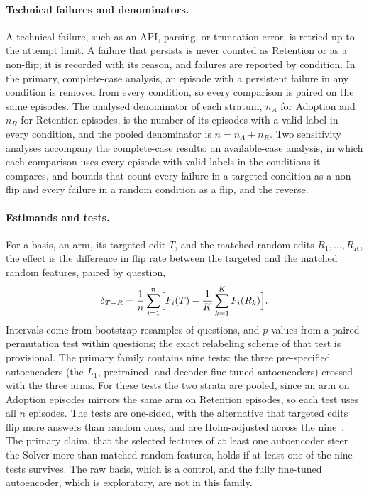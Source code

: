 \paragraph{Technical failures and denominators.} A technical failure, such as
an API, parsing, or truncation error, is retried up to the attempt limit. A
failure that persists is never counted as Retention or as a non-flip; it is
recorded with its reason, and failures are reported by condition. In the
primary, complete-case analysis, an episode with a persistent failure in any
condition is removed from every condition, so every comparison is paired on
the same episodes. The analysed denominator of each stratum, $n_A$ for
Adoption and $n_R$ for Retention episodes, is the number of its episodes with
a valid label in every condition, and the pooled denominator is
$n = n_A + n_R$. Two sensitivity analyses accompany the complete-case results:
an available-case analysis, in which each comparison uses every episode with
valid labels in the conditions it compares, and bounds that count every
failure in a targeted condition as a non-flip and every failure in a random
condition as a flip, and the reverse.

\paragraph{Estimands and tests.} For a basis, an arm, its targeted edit $T$,
and the matched random edits $R_1, \ldots, R_K$, the effect is the difference
in flip rate between the targeted and the matched random features, paired by
question,
\begin{equation}
  \delta_{T-R} = \frac{1}{n}\sum_{i=1}^{n}
  \Bigl[F_i(T) - \frac{1}{K}\sum_{k=1}^{K} F_i(R_k)\Bigr].
  \label{eq:targeted-vs-random}
\end{equation}
Intervals come from bootstrap resamples of questions, and $p$-values from a
paired permutation test within questions; the exact relabeling scheme of that
test is provisional. The primary family contains nine tests: the three
pre-specified autoencoders (the $L_1$, pretrained, and decoder-fine-tuned
autoencoders) crossed with the three arms. For these tests the two strata are
pooled, since an arm on Adoption episodes mirrors the same arm on Retention
episodes, so each test uses all $n$ episodes. The tests are one-sided, with
the alternative that targeted edits flip more answers than random ones, and
are Holm-adjusted across the nine~\cite{holm1979simple}. The primary claim,
that the selected features of at least one autoencoder steer the Solver more
than matched random features, holds if at least one of the nine tests
survives. The raw basis, which is a control, and the fully fine-tuned
autoencoder, which is exploratory, are not in this family.

